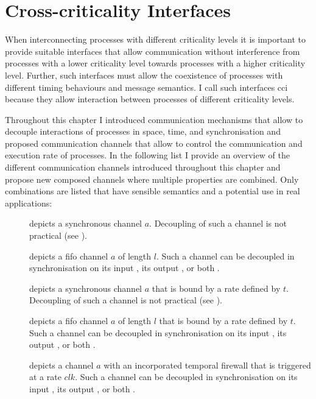 \section{Cross-criticality Interfaces}
\label{sect_tcm_cci}
When interconnecting processes with different criticality levels it is important to provide suitable interfaces that allow communication without interference from processes with a lower criticality level towards processes with a higher criticality level.
Further, such interfaces must allow the coexistence of processes with different timing behaviours and message semantics.
I call such interfaces \gls{cci} because they allow interaction between processes of different criticality levels.

Throughout this chapter I introduced communication mechanisms that allow to decouple interactions of processes in space, time, and synchronisation and proposed communication channels that allow to control the communication and execution rate of processes.
In the following list I provide an overview of the different communication channels introduced throughout this chapter and propose new composed channels where multiple properties are combined.
Only combinations are listed that have sensible semantics and a potential use in real applications:
\begin{description}
    \item[] depicts a synchronous channel $a$.
        Decoupling of such a channel is not practical (see \Sect{\ref{sect_cci_decoupling_sync}}).
    \item[] depicts a \gls{fifo} channel $a$ of length $l$.
        Such a channel can be decoupled in synchronisation on its input , its output , or both .
    \item[] depicts a synchronous channel $a$ that is bound by a rate defined by $t$.
        Decoupling of such a channel is not practical (see \Sect{\ref{sect_cci_decoupling_sync}}).
    \item[] depicts a \gls{fifo} channel $a$ of length $l$ that is bound by a rate defined by $t$.
        Such a channel can be decoupled in synchronisation on its input , its output , or both .
    \item[] depicts a channel $a$ with an incorporated temporal firewall that is triggered at a rate $clk$.
        Such a channel can be decoupled in synchronisation on its input , its output , or both .
\end{description}

